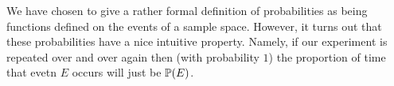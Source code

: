 \begin{remark}
    We have chosen to give a rather formal definition of probabilities as being functions defined on the events of a sample space. However, it turns out that these probabilities have a nice intuitive property. Namely, if our experiment is repeated over and over again then (with probability $1$) the proportion of time that evetn $E$ occurs will just be $\mathbb{P} (E)$.
\end{remark}